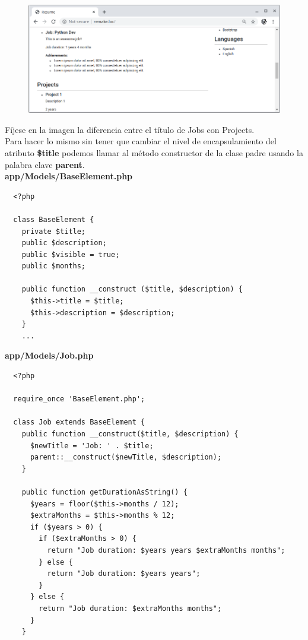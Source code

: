 \documentclass{article}
\begin{document}
\begin{figure}[h!]
  \centering
  \includegraphics[scale=0.5]{./Pictures/047_pol_constructor.png}
\end{figure}

Fíjese en la imagen la diferencia entre el título de Jobs con Projects.\\

Para hacer lo mismo sin tener que cambiar el nivel de encapsulamiento del
atributo \textbf{\$title} podemos llamar al método constructor de la clase
padre usando la palabra clave \textbf{parent}.\\

\textbf{app/Models/BaseElement.php}
\begin{verbatim}
  <?php

  class BaseElement {
    private $title;
    public $description;
    public $visible = true;
    public $months;

    public function __construct ($title, $description) {
      $this->title = $title;
      $this->description = $description;
    }
    ...
\end{verbatim}

\textbf{app/Models/Job.php}
\begin{verbatim}
  <?php

  require_once 'BaseElement.php';

  class Job extends BaseElement {
    public function __construct($title, $description) {
      $newTitle = 'Job: ' . $title;
      parent::__construct($newTitle, $description);
    }

    public function getDurationAsString() {
      $years = floor($this->months / 12);
      $extraMonths = $this->months % 12;
      if ($years > 0) {
        if ($extraMonths > 0) {
          return "Job duration: $years years $extraMonths months";
        } else {
          return "Job duration: $years years";
        }
      } else {
        return "Job duration: $extraMonths months";
      }
    }
\end{verbatim}
\end{document}
